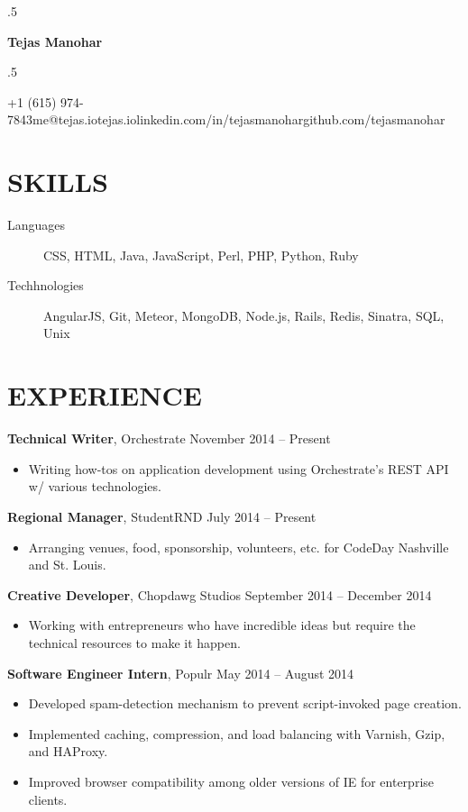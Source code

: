 \documentclass{res}
\newcommand*{\its}{\hspace{0.8cm}}
\begin{document}
\moveleft.5\hoffset\centerline{\Huge\bf Tejas Manohar}
\bigskip
\moveleft.5\hoffset\centerline{+1 (615) 974-7843\its{}me@tejas.io\its{}\its{}tejas.io\its{}linkedin.com/in/tejasmanohar\its{}github.com/tejasmanohar}

\section{SKILLS}

\begin{description}
  \item[Languages] CSS, HTML, Java, JavaScript, Perl, PHP, Python, Ruby
  \item[Techhnologies] AngularJS, Git, Meteor, MongoDB, Node.js, Rails, Redis, Sinatra, SQL, Unix
\end{description}

\section{EXPERIENCE}

{\bf Technical Writer}, Orchestrate \hfill November 2014 -- Present
\begin{itemize} \itemsep -2pt
  \item Writing how-tos on application development using Orchestrate's REST API w/ various technologies.
\end{itemize}

{\bf Regional Manager}, StudentRND \hfill July 2014 -- Present
\begin{itemize} \itemsep -2pt
  \item Arranging venues, food, sponsorship, volunteers, etc. for CodeDay Nashville and St. Louis.
\end{itemize}

{\bf Creative Developer}, Chopdawg Studios \hfill September 2014 -- December 2014
\begin{itemize} \itemsep -2pt
  \item Working with entrepreneurs who have incredible ideas but require the technical resources to make it happen.
\end{itemize}

{\bf Software Engineer Intern}, Populr \hfill May 2014 -- August 2014
\begin{itemize} \itemsep -2pt
  \item Developed spam-detection mechanism to prevent script-invoked page creation.
  \item Implemented caching, compression, and load balancing with Varnish, Gzip, and HAProxy.
  \item Improved browser compatibility among older versions of IE for enterprise clients.
\end{itemize}
\end{document}
